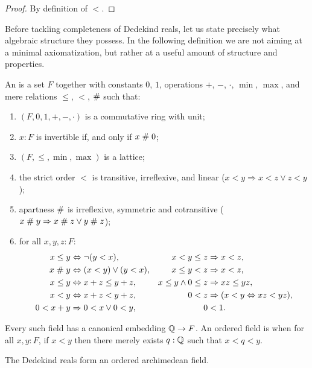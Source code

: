 \begin{proof}
  By definition of $<$.
\end{proof}

Before tackling completeness of Dedekind reals, let us state precisely what algebraic
structure they possess. In the following definition we are not aiming at a minimal
axiomatization, but rather at a useful amount of structure and properties.

\begin{defn} \label{ordered-field} An  is a set $F$ together with
  constants $0$, $1$, operations $+$, $-$, $\cdot$, $\min$, $\max$, and mere relations
  $\leq$, $<$, $\mathrel{\#}$ such that:
  \begin{enumerate}
  \item $(F, 0, 1, {+}, {-}, {\cdot})$ is a commutative ring with unit;
  \item $x : F$ is invertible if, and only if $x \mathrel{\#} 0$;
  \item $(F, {\leq}, {\min}, {\max})$ is a lattice;
  \item the strict order $<$ is transitive, irreflexive, and linear ($x < y \Rightarrow x < z \lor z < y$);
  \item apartness $\mathrel{\#}$ is irreflexive, symmetric and cotransitive ($x \mathrel{\#} y \Rightarrow x \mathrel{\#} z \lor y \mathrel{\#} z$);
  \item for all $x, y, z : F$:
    \begin{align*}
      x \leq y &\Leftrightarrow \lnot (y < x), &
      x < y \leq z &\Rightarrow x < z, \\
      x \mathrel{\#} y &\Leftrightarrow (x < y) \lor (y < x), &
      x \leq y < z &\Rightarrow x < z, \\
      x \leq y &\Leftrightarrow x + z \leq y + z, &
      x \leq y \land 0 \leq z &\Rightarrow x z \leq y z, \\
      x < y &\Leftrightarrow x + z < y + z, &
      0 < z &\Rightarrow (x < y \Leftrightarrow x z < y z), \\
      0 < x + y &\Rightarrow 0 < x \lor 0 < y, &
      0 &< 1.
    \end{align*}
  \end{enumerate}
  Every such field has a canonical embedding $\mathbb{Q} \to F$. An ordered field is
   when for all $x, y : F$, if $x < y$ then there merely exists $q :
  \mathbb{Q}$ such that $x < q < y$.
\end{defn}

\begin{thm} \label{RD-archimedean-ordered-field}
  The Dedekind reals form an ordered archimedean field.
\end{thm}

